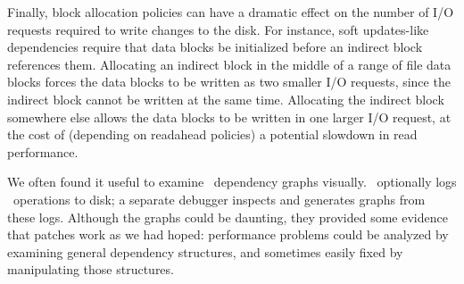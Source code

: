 \begin{comment}
The buffer cache and a few other \modules\ perform better in the
common case that each block's \patches\ are listed in order of creation
time,
%
taking $O(n)$ time to process $n$ patches rather than $O(n^2)$.
\end{comment}

Finally, block allocation policies can have a dramatic effect on the number of
I/O requests required to write changes to the disk. For instance, soft
updates-like dependencies require that data blocks be initialized before
an indirect block references them.   
Allocating an
indirect block in the middle of a range of file data blocks
forces the data blocks to be
written as two smaller I/O requests, since the indirect block
cannot be written at the same time. Allocating the indirect block somewhere
else allows the data blocks to be written in one larger I/O request, at the
cost of (depending on readahead policies) a potential slowdown in read performance.



We often found it useful to examine \patch\ dependency graphs visually.
\Kudos\ optionally logs \patch\ operations to disk;
a separate debugger inspects and generates graphs from these
logs.
%
Although the graphs could be daunting, they provided some evidence that
patches work as we had hoped: performance problems could
be analyzed by examining general dependency structures, and
sometimes easily fixed by manipulating those structures.


\begin{comment}
Several functions in \Kudos\ iterate over lists of \patches\ looking for either
a single \patch\ or set of \patches\ satisfying some property, or trying to
process all the \patches\ in the list in some order determined by the dependency
graph. It is generally the case that the \patches\ satisfying the property or
the order in which the \patches\ should be processed can be determined very
quickly by keeping the lists sorted. For instance, the library function which
reverts \patches\ needs to perform the revert operations essentially in inverse
creation order, so that reverting a \patch\ which has since been overwritten
by a later \patch\ does the right thing. Keeping the list of all \patches\ on a
block sorted in creation order (which is very easy) makes this an efficient
operation, while it might otherwise take $O(n^2)$ time to execute. Similarly,
many \patch\ merging functions need to find for a given block some \patch\
which has no \befores\ on the same block, and the oldest \patch\ on a block
always satisfies this requirement.
\end{comment}
